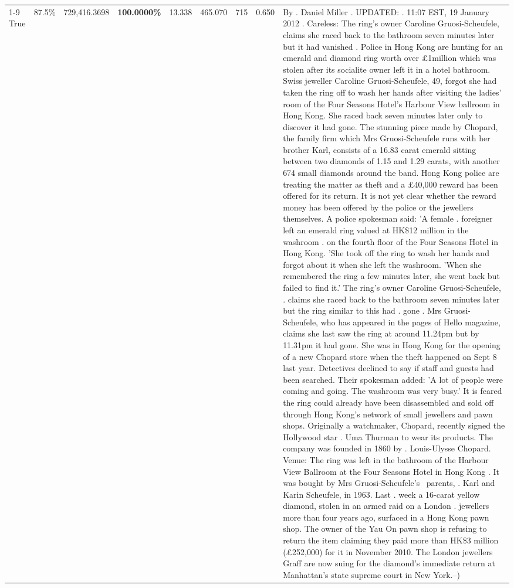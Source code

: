 \begin{table}[H]
\begin{tabular}{lllrlllll}
\cline{1-9}
True & 87.5\% & 729,416.3698 & \bfseries \color{red} 100.0000\% & 13.338 & 465.070 & 715 & 0.650 & By . Daniel Miller . UPDATED: . 11:07 EST, 19 January 2012 . Careless: The ring's owner Caroline Gruosi-Scheufele, claims she raced back to the bathroom seven minutes later but it had vanished . Police in Hong Kong are hunting for an emerald and diamond ring worth over £1million which was stolen after its socialite owner left it in a hotel bathroom. Swiss jeweller Caroline Gruosi-Scheufele, 49, forgot she had taken the ring off to wash her hands after visiting the ladies' room of the Four Seasons Hotel's Harbour View ballroom in Hong Kong. She raced back seven minutes later only to discover it had gone. The stunning piece made by Chopard, the family firm which Mrs Gruosi-Scheufele runs with her brother Karl, consists of a 16.83 carat emerald sitting between two diamonds of 1.15 and 1.29 carats, with another 674 small diamonds around the band. Hong Kong police are treating the matter as theft and a £40,000 reward has been offered for its return. It is not yet clear whether the reward money has been offered by the police or the jewellers themselves. A police spokesman said: 'A female . foreigner left an emerald ring valued at HK\$12 million in the washroom . on the fourth floor of the Four Seasons Hotel in Hong Kong. 'She took off the ring to wash her hands and forgot about it when she left the washroom. 'When she remembered the ring a few minutes later, she went back but failed to find it.' The ring's owner Caroline Gruosi-Scheufele, . claims she raced back to the bathroom seven minutes later but the ring similar to this had . gone . Mrs Gruosi-Scheufele, who has appeared in the pages of Hello magazine, claims she last saw the ring at around 11.24pm but by 11.31pm it had gone. She was in Hong Kong for the opening of a new Chopard store when the theft happened on Sept 8 last year. Detectives declined to say if staff and guests had been searched. Their spokesman added: 'A lot of people were coming and going. The washroom was very busy.' It is feared the ring could already have been disassembled and sold off through Hong Kong's network of small jewellers and pawn shops. Originally a watchmaker, Chopard, recently signed the Hollywood star . Uma Thurman to wear its products. The company was founded in 1860 by . Louis-Ulysse Chopard. Venue: The ring was left in the bathroom of the Harbour View Ballroom at the Four Seasons Hotel in Hong Kong . It was bought by Mrs Gruosi-Scheufele's  parents, . Karl and Karin Scheufele, in 1963. Last . week a 16-carat yellow diamond, stolen in an armed raid on a London . jewellers more than four years ago, surfaced in a Hong Kong pawn shop. The owner of the Yau On pawn shop is refusing to return the item claiming they paid more than HK\$3 million (£252,000) for it in November 2010. The London jewellers Graff are now suing for the diamond’s immediate return at Manhattan’s state supreme court in New York.--) \\

\end{tabular}
\end{table}
